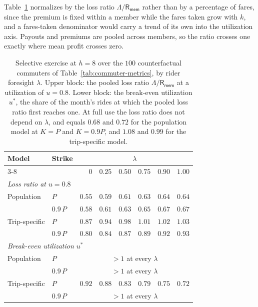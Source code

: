 \documentclass[12pt]{article}
\def\memebership{\textsf{R}_\textsf{mem}}
\begin{document}
{{{{{{{{Table~\ref{tab:selective-exercise} normalizes by the loss ratio $\Lambda/\memebership$ rather
than by a percentage of fares, since the premium is fixed within a member while the fares
taken grow with $k$, and a fares-taken denominator would carry a trend of its own into the
utilization axis. Payouts and premiums are pooled across members, so the ratio crosses one
exactly where mean profit crosses zero.

\begin{table}[ht]
\centering
\caption{Selective exercise at $h = 8$ over the $100$ counterfactual commuters of
Table~\ref{tab:commuter-metrics}, by rider foresight $\lambda$. Upper block: the pooled loss
ratio $\Lambda/\memebership$ at a utilization of $u = 0.8$. Lower block: the break-even
utilization $u^{*}$, the share of the month's rides at which the pooled loss ratio first
reaches one. At full use the loss ratio does not depend on $\lambda$, and equals $0.68$ and
$0.72$ for the population model at $K = P$ and $K = 0.9P$, and $1.08$ and $0.99$ for the
trip-specific model.}
\label{tab:selective-exercise}
\begin{tabular}{l l | r r r r r r}
\hline
Model & Strike & \multicolumn{6}{c}{$\lambda$} \\
\cline{3-8}
 & & $0$ & $0.25$ & $0.50$ & $0.75$ & $0.90$ & $1.00$ \\
\hline
\multicolumn{8}{l}{\textit{Loss ratio at $u = 0.8$}} \\
Population    & $P$      & $0.55$ & $0.59$ & $0.61$ & $0.63$ & $0.64$ & $0.64$ \\
              & $0.9\,P$ & $0.58$ & $0.61$ & $0.63$ & $0.65$ & $0.67$ & $0.67$ \\
Trip-specific & $P$      & $0.87$ & $0.94$ & $0.98$ & $1.01$ & $1.02$ & $1.03$ \\
              & $0.9\,P$ & $0.80$ & $0.84$ & $0.87$ & $0.89$ & $0.92$ & $0.93$ \\
\hline
\multicolumn{8}{l}{\textit{Break-even utilization $u^{*}$}} \\
Population    & $P$      & \multicolumn{6}{c}{$> 1$ at every $\lambda$} \\
              & $0.9\,P$ & \multicolumn{6}{c}{$> 1$ at every $\lambda$} \\
Trip-specific & $P$      & $0.92$ & $0.88$ & $0.83$ & $0.79$ & $0.75$ & $0.72$ \\
              & $0.9\,P$ & \multicolumn{6}{c}{$> 1$ at every $\lambda$} \\
\hline
\end{tabular}
\end{table}

}}}}}}}}
\end{document}
